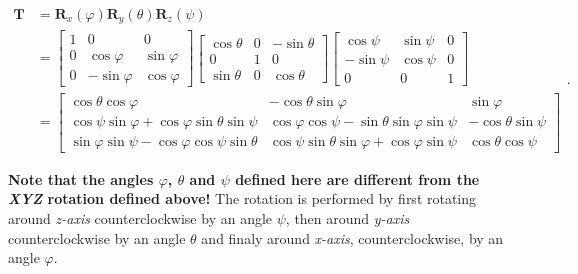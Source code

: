 \documentclass[10pt,b5paper,titlepage]{book}
\begin{document}
\begin{enumerate}
        \begin{equation}
            \begin{array}{ll}
                \mathbf{T}
                &= \mathbf{R}_{x}(\varphi)\mathbf{R}_{y}(\theta)\mathbf{R}_{z}(\psi) \\
                &=
                \begin{bmatrix}
                    1 & 0 & 0 \\
                    0 & \cos \varphi & \sin \varphi \\
                    0 & -\sin \varphi & \cos \varphi
                \end{bmatrix}
                \begin{bmatrix}
                    \cos \theta & 0 & -\sin \theta \\
                    0 & 1 & 0 \\
                    \sin \theta & 0 & \cos \theta
                \end{bmatrix}
                \begin{bmatrix}
                    \cos \psi & \sin \psi & 0 \\
                    -\sin \psi & \cos \psi & 0 \\
                    0 & 0 & 1
                \end{bmatrix} \\
                &=
                \begin{bmatrix}
                    \cos \theta \cos \varphi
                    & - \cos \theta \sin \varphi
                    & \sin \varphi \\
                    \cos \psi \sin \varphi + \cos \varphi \sin \theta \sin \psi
                    & \cos \varphi \cos \psi - \sin \theta \sin \varphi \sin \psi
                    & -\cos \theta \sin \psi \\
                    \sin \varphi \sin \psi - \cos \varphi \cos \psi \sin \theta
                    & \cos \psi \sin \theta \sin \varphi + \cos \varphi \sin \psi
                    & \cos \theta \cos \psi
                \end{bmatrix}
            \end{array}
        .\end{equation}

        \textbf{Note that the angles $\varphi$, $\theta$ and $\psi$ defined here are
        different from the \textit{XYZ} rotation defined above!} The rotation
        is performed by first rotating around \textit{z-axis} counterclockwise
        by an angle $\psi$, then around \textit{y-axis} counterclockwise
        by an angle $\theta$ and finaly around \textit{x-axis}, counterclockwise,
        by an angle $\varphi$.


\end{enumerate}
\end{document}
